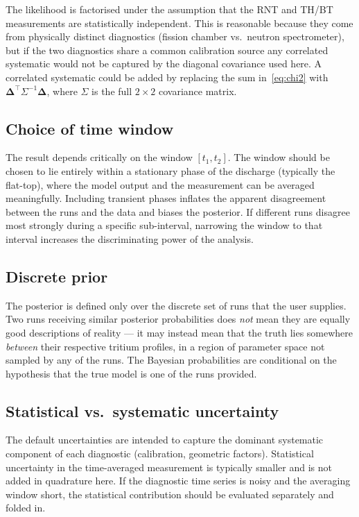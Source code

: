 \documentclass[11pt,a4paper]{article}
\begin{document}
The likelihood is factorised under the assumption that the RNT and TH/BT
measurements are statistically independent. This is reasonable because
they come from physically distinct diagnostics (fission chamber vs.\
neutron spectrometer), but if the two diagnostics share a common
calibration source any correlated systematic would not be captured by the
diagonal covariance used here. A correlated systematic could be added by
replacing the sum in~\eqref{eq:chi2} with $\boldsymbol{\Delta}^\top
\Sigma^{-1} \boldsymbol{\Delta}$, where $\Sigma$ is the full
$2 \times 2$ covariance matrix.

\subsection{Choice of time window}

The result depends critically on the window $[t_1, t_2]$. The window
should be chosen to lie entirely within a stationary phase of the
discharge (typically the flat-top), where the model output and the
measurement can be averaged meaningfully. Including transient phases
inflates the apparent disagreement between the runs and the data and
biases the posterior. If different runs disagree most strongly during a
specific sub-interval, narrowing the window to that interval increases
the discriminating power of the analysis.

\subsection{Discrete prior}

The posterior is defined only over the discrete set of runs that the
user supplies. Two runs receiving similar posterior probabilities does
\emph{not} mean they are equally good descriptions of reality --- it
may instead mean that the truth lies somewhere \emph{between} their
respective tritium profiles, in a region of parameter space not sampled
by any of the runs. The Bayesian probabilities are conditional on the
hypothesis that the true model is one of the runs provided.

\subsection{Statistical vs.\ systematic uncertainty}

The default uncertainties are intended to capture the dominant
systematic component of each diagnostic (calibration, geometric
factors). Statistical uncertainty in the time-averaged measurement is
typically smaller and is not added in quadrature here. If the
diagnostic time series is noisy and the averaging window short, the
statistical contribution should be evaluated separately and folded in.
\end{document}

